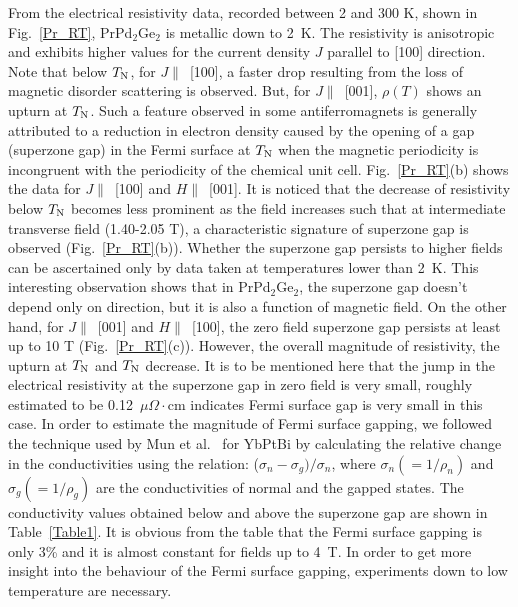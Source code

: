 \documentclass[preprint,showpacs,preprintnumbers,amsmath,amssymb, prb]{revtex4}
\begin{document}
From the electrical resistivity data, recorded between 2 and 300 K, shown in Fig.~\ref{Pr_RT}, PrPd$_2$Ge$_2$ is metallic down to 2~K. The resistivity is anisotropic and exhibits higher values for the current density  $J$ parallel to [100] direction. Note that below  $T_{\rm N}$, for $J\parallel$~[100], a faster drop resulting from the loss of magnetic disorder scattering is observed. But, for $J\parallel$~[001], $\rho(T)$ shows an upturn at $T_{\rm N}$. Such a feature observed in some antiferromagnets is generally attributed to a reduction in electron density caused by the opening of a gap (superzone gap) in the Fermi surface at $T_{\rm N}$  when the magnetic periodicity is incongruent with the periodicity of the chemical unit cell. Fig.~\ref{Pr_RT}(b) shows the data for $J\parallel$~[100] and $H\parallel$~[001]. It is noticed that the decrease of resistivity below $T_{\rm N}$ becomes less prominent as the field increases such that  at intermediate transverse field (1.40-2.05 T), a characteristic signature of superzone gap is observed (Fig.~\ref{Pr_RT}(b)). Whether the superzone gap persists to higher fields can be ascertained only by data taken at temperatures lower than 2~K. This interesting observation shows that in PrPd$_2$Ge$_2$, the superzone gap doesn't depend only on direction, but it is also a function of magnetic field. On the other hand, for $J\parallel$~[001] and $H\parallel$~[100], the zero field superzone gap persists at least up to 10 T (Fig.~\ref{Pr_RT}(c)). However, the   overall magnitude of resistivity, the upturn at $T_{\rm N}$  and $T_{\rm N}$ decrease. It is to be mentioned here that the jump in the electrical resistivity at the superzone gap in zero field is very small, roughly estimated to be 0.12~$\mu \Omega\cdot$cm indicates Fermi surface gap is very small in this case.  In order to estimate the magnitude of Fermi surface gapping, we followed the technique used by Mun et al.~\cite{Mun} for YbPtBi by calculating the relative change in the conductivities  using the relation:  ($\sigma_n - \sigma_g)/\sigma_n$, where $\sigma_n (= 1/\rho_n)$ and $\sigma_g (= 1/\rho_g)$ are the  conductivities of normal and the gapped states.  The conductivity values obtained below and above the superzone gap are shown in Table~\ref{Table1}.  It is obvious from the table that the Fermi surface gapping is only 3\% and it is almost constant for fields up to 4~T.  In order to get more insight into the behaviour of the Fermi surface gapping, experiments down to low temperature are necessary.  
\end{document}
